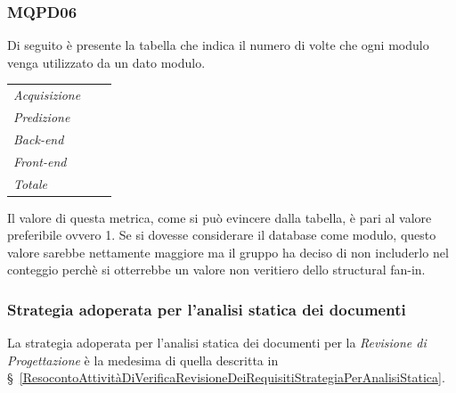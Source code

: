 {{{{{{{{{{\subsubsection{MQPD06}\label{ResocontoAttivitàDiVerificaRevisioneDiQualificaVerificheDiProcessoMQPD06}

Di seguito è presente la tabella che indica il numero di volte che ogni modulo venga utilizzato da un dato modulo.

\quad
\def\tabularxcolumn#1{m{#1}}
{
	\begin{center}
		\renewcommand{\arraystretch}{1.4}
		\begin{longtable}[c]{|p{3cm}|p{5cm}|p{5cm}|}
			\hline
			\rowcolor{airforceblue}
			\makecell[c]{\textbf{Modulo}} & \makecell[c]{\textbf{Numero di chiamate}} & \makecell[c]{\textbf{Modulo chiamante}}\\
			\hline
			\textit{Acquisizione} & \makecell[c]{0} & \makecell[c]{-}\\
			\hline
			\textit{Predizione} & \makecell[c]{0} & \makecell[c]{-}\\
			\hline
			\textit{Back-end} &  \makecell[c]{1} & \makecell[c]{Front end}\\
			\hline
			\textit{Front-end} &  \makecell[c]{0} & \makecell[c]{-}\\
			\hline
			\textit{Totale} & \makecell[c]{1} & \makecell[c]{Front end}\\
			\hline
		\end{longtable}
	\end{center}

Il valore di questa metrica, come si può evincere dalla tabella, è pari al valore preferibile ovvero 1. Se si dovesse considerare il database come modulo, questo valore sarebbe nettamente maggiore ma il gruppo ha deciso di non includerlo nel conteggio perchè si otterrebbe un valore non veritiero dello structural fan-in.

\subsubsection{Strategia adoperata per l'analisi statica dei documenti}\label{ResocontoAttivitàDiVerificaRevisioneDiQualificaVerificheDiProdottoStrategiaAdoperataPerLAnalisiStaticaDeiDocumenti}
La strategia adoperata per l’analisi statica dei documenti per la \textit{Revisione di Progettazione} è la medesima di quella descritta in \S~\ref{ResocontoAttivitàDiVerificaRevisioneDeiRequisitiStrategiaPerAnalisiStatica}.

}}}}}}}}}}}
